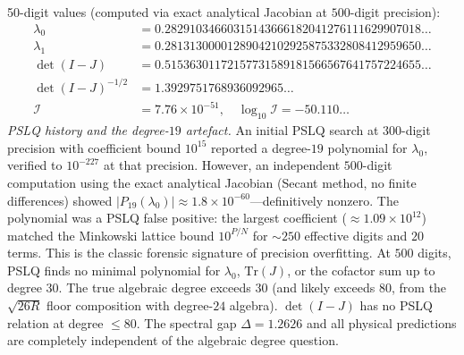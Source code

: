 \documentclass[11pt,a4paper]{article}
\theoremstyle{definition}
\theoremstyle{remark}
\begin{document}
\begin{enumerate}[nosep]
50-digit values (computed via exact analytical Jacobian at $500$-digit precision):
\begin{align*}
\lambda_0 &= 0.28291034660315143666182041276111629907018\ldots\\
\lambda_1 &= 0.28131300001289042102925875332808412959650\ldots\\
\det(I-J) &= 0.51536301172157731589181566567641757224655\ldots\\
\det(I-J)^{-1/2} &= 1.3929751768936092965\ldots\\
\mathcal{I} &= 7.76\times 10^{-51},\quad \log_{10}\mathcal{I}=-50.110\ldots
\end{align*}
\emph{PSLQ history and the degree-$19$ artefact.} An initial PSLQ search at $300$-digit precision with coefficient bound $10^{15}$ reported a degree-$19$ polynomial for $\lambda_0$, verified to $10^{-227}$ at that precision. However, an independent $500$-digit computation using the exact analytical Jacobian (Secant method, no finite differences) showed $|P_{19}(\lambda_0)|\approx 1.8\times 10^{-60}$---definitively nonzero. The polynomial was a PSLQ false positive: the largest coefficient ($\approx 1.09\times 10^{12}$) matched the Minkowski lattice bound $10^{P/N}$ for $\sim\!250$ effective digits and $20$ terms. This is the classic forensic signature of precision overfitting. At $500$ digits, PSLQ finds no minimal polynomial for $\lambda_0$, $\mathrm{Tr}(J)$, or the cofactor sum up to degree $30$. The true algebraic degree exceeds $30$ (and likely exceeds $80$, from the $\sqrt{26R}$ floor composition with degree-$24$ algebra). $\det(I-J)$ has no PSLQ relation at degree $\leq 80$. The spectral gap $\Delta=1.2626$ and all physical predictions are completely independent of the algebraic degree question.


\end{enumerate}
\end{document}
